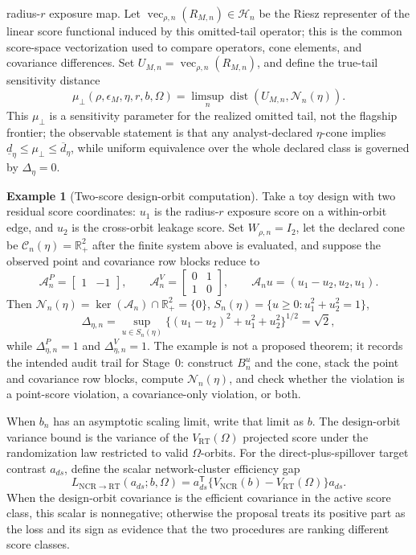 \documentclass[11pt]{article}
\newcommand{\transpose}{\mathsf{T}}
\newcommand{\R}{\mathbb{R}}
\theoremstyle{definition}
\newtheorem{example}{Example}
\theoremstyle{plain}
\theoremstyle{remark}
\begin{document}
radius-\(r\) exposure map.  Let
\(\operatorname{vec}_{\rho,n}(R_{M,n})\in\mathcal H_n\) be the Riesz
representer of the linear score functional induced by this omitted-tail
operator; this is the common score-space vectorization used to compare
operators, cone elements, and covariance differences.  Set
\(U_{M,n}=\operatorname{vec}_{\rho,n}(R_{M,n})\), and define the true-tail
sensitivity distance
\[
  \mu_{\perp}(\rho,\epsilon_M,\eta,r,b,\Omega)
  =
  \limsup_n \operatorname{dist}(U_{M,n},\mathcal N_n(\eta)).
\]
This \(\mu_{\perp}\) is a sensitivity parameter for the realized omitted tail,
not the flagship frontier; the observable statement is that any
analyst-declared \(\eta\)-cone implies
\(\underline d_\eta\le \mu_{\perp}\le \overline d_\eta\), while uniform
equivalence over the whole declared class is governed by \(\Delta_\eta=0\).

\begin{example}[Two-score design-orbit computation]\label{ex:two-score-orbit}
Take a toy design with two residual score coordinates: \(u_1\) is the
radius-\(r\) exposure score on a within-orbit edge, and \(u_2\) is the
cross-orbit leakage score.  Set \(W_{\rho,n}=I_2\), let the declared cone be
\(\mathcal C_n(\eta)=\R^2_+\) after the finite system above is evaluated, and
suppose the observed point and covariance row blocks reduce to
\[
  \mathcal A^P_n=\begin{bmatrix}1&-1\end{bmatrix},
  \qquad
  \mathcal A^V_n=\begin{bmatrix}0&1\\1&0\end{bmatrix},
  \qquad
  \mathcal A_n u=(u_1-u_2,u_2,u_1).
\]
Then
\(\mathcal N_n(\eta)=\ker(\mathcal A_n)\cap\R^2_+=\{0\}\),
\(S_n(\eta)=\{u\ge0:u_1^2+u_2^2=1\}\),
\[
  \Delta_{\eta,n}=\sup_{u\in S_n(\eta)}
     \{(u_1-u_2)^2+u_1^2+u_2^2\}^{1/2}=\sqrt2,
\]
while \(\Delta^P_{\eta,n}=1\) and \(\Delta^V_{\eta,n}=1\).  The example is
not a proposed theorem; it records the intended audit trail for Stage~0:
construct \(B^u_n\) and the cone, stack the point and covariance row blocks,
compute \(\mathcal N_n(\eta)\), and check whether the violation is a
point-score violation, a covariance-only violation, or both.
\end{example}
When \(b_n\) has an asymptotic scaling limit, write that limit as \(b\).  The design-orbit
variance bound is the variance of the \(V_{\mathrm{RT}}(\Omega)\) projected
score under the randomization law restricted to valid \(\Omega\)-orbits.  For
the direct-plus-spillover target contrast \(a_{ds}\), define the scalar
network-cluster efficiency gap
\[
  L_{\mathrm{NCR}\to\mathrm{RT}}(a_{ds};b,\Omega)
  =
  a_{ds}^{\transpose}\{V_{\mathrm{NCR}}(b)-V_{\mathrm{RT}}(\Omega)\}a_{ds}.
\]
When the design-orbit covariance is the efficient covariance in the active
score class, this scalar is nonnegative; otherwise the proposal treats its
positive part as the loss and its sign as evidence that the two procedures are
ranking different score classes.
\end{document}
